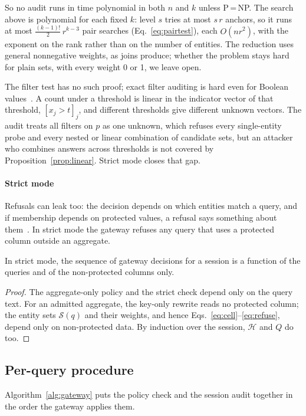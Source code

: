 \documentclass[sigconf,nonacm]{acmart}
\begin{document}
So no audit runs in time polynomial in both $n$ and $k$ unless P\,=\,NP. The search above is polynomial for each fixed $k$: level $s$ tries at most $s\,r$ anchors, so it runs at most $\frac{(k-1)!}{2}\,r^{k-3}$ pair searches (Eq.~\ref{eq:pairtest}), each $O(nr^2)$, with the exponent on the rank rather than on the number of entities. The reduction uses general nonnegative weights, as joins produce; whether the problem stays hard for plain sets, with every weight 0 or 1, we leave open.

The filter test has no such proof; exact filter auditing is hard even for Boolean values~\cite{kleinberg2003boolean}. A count under a threshold is linear in the indicator vector of that threshold, $[x_j>t]_j$, and different thresholds give different unknown vectors. The audit treats all filters on $p$ as one unknown, which refuses every single-entity probe and every nested or linear combination of candidate sets, but an attacker who combines answers across thresholds is not covered by Proposition~\ref{prop:linear}. Strict mode closes that gap.

\paragraph{Strict mode} Refusals can leak too: the decision depends on which entities match a query, and if membership depends on protected values, a refusal says something about them~\cite{kenthapadi2005simulatable}. In strict mode the gateway refuses any query that uses a protected column outside an aggregate.

\begin{proposition}\label{prop:strict}
In strict mode, the sequence of gateway decisions for a session is a function of the queries and of the non-protected columns only.
\end{proposition}
\begin{proof}
The aggregate-only policy and the strict check depend only on the query text. For an admitted aggregate, the key-only rewrite reads no protected column; the entity sets $\mathcal{S}(q)$ and their weights, and hence Eqs.~\ref{eq:cell}--\ref{eq:refuse}, depend only on non-protected data. By induction over the session, $\mathcal{H}$ and $Q$ do too.
\end{proof}

\subsection{Per-query procedure}\label{sec:pipeline}
Algorithm~\ref{alg:gateway} puts the policy check and the session audit together in the order the gateway applies them.
\end{document}

